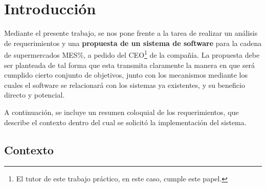 
\section{Introducción}

Mediante el presente trabajo, se nos pone frente a la tarea de realizar un
análisis de requerimientos y una \textbf{propuesta de un sistema de software}
para la cadena de supermercados MES\%, a pedido del CEO\footnote{El tutor de
este trabajo práctico, en este caso, cumple este papel.} de la compañía. La
propuesta debe ser planteada de tal forma que esta transmita claramente la
manera en que será cumplido cierto conjunto de objetivos, junto con los
mecanismos mediante los cuales el software se relacionará con los sistemas ya
existentes, y su beneficio directo y potencial.

A continuación, se incluye un resumen coloquial de los requerimientos, que
describe el contexto dentro del cual se solicitó la implementación del sistema.

\subsection{Contexto}

